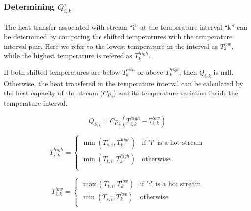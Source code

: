 \documentclass[10pt,twoside,a4paper]{report}
\begin{document}



\subsubsection{Determining  $Q_{i,k}^\tau$}
The heat transfer associated with stream ``i'' at the temperature
interval ``k'' can be determined by comparing the shifted temperatures
with the temperature interval pair. Here we refer to the lowest
temperature in the interval as $T_k^{low}$, while the highest
temperature is refered as $T_k^{high}$.

If both shifted temperatures are below $T_k^{min}$ or above
$T_k^{high}$, then $Q_{i,k}$ is null. Otherwise, the heat transfered
in the temperature interval can be calculated by the heat capacity of
the stream ($Cp_i$) and its temperature variation inside the
temperature interval.

\begin{equation}
  \label{eq:heat}
  Q_{k,i}=Cp_i(T_{i,k}^{high}-T_{i,k}^{low})
\end{equation}

\begin{equation}
  \label{eq:t_high}
  T_{i,k}^{high} =
  \begin{cases}
    \min(T_{s,i},T_k^{high}) & \text{if "i" is a hot stream}\\
    \min(T_{t,i},T_k^{high}) & \text{otherwise}\\
  \end{cases}
\end{equation}

\begin{equation}
  \label{eq:t_low}
  T_{i,k}^{low} =
  \begin{cases}
    \max(T_{t,i},T_k^{low}) & \text{if "i" is a hot stream}\\
    \min(T_{s,i},T_k^{low}) & \text{otherwise}\\
  \end{cases}
\end{equation}
\end{document}
